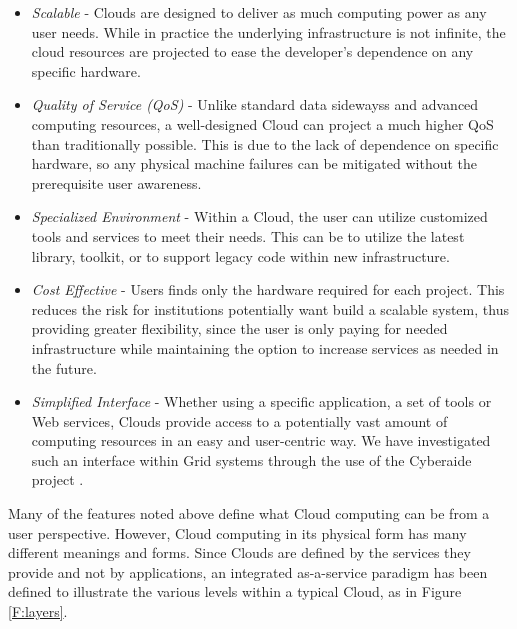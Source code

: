 \begin{itemize}

\item{\em Scalable} - Clouds are designed to deliver as much computing power as any user needs.  While in practice the underlying infrastructure is not infinite, the cloud resources are projected to ease the developer's dependence on any specific hardware.

\item{\em Quality of Service (QoS)} - Unlike standard data sidewayss and advanced computing resources, a well-designed Cloud can project a much higher QoS than traditionally possible.  This is due to the lack of dependence on specific hardware, so any physical machine failures can be mitigated without the prerequisite user awareness.

\item{\em Specialized Environment} - Within a Cloud, the user can utilize customized tools and services to meet their needs. This can be to utilize the latest library, toolkit, or to support legacy code within new infrastructure.  

\item{\em Cost Effective} - Users finds only the hardware required for each project.  This reduces the risk for institutions potentially want build a scalable system, thus providing greater flexibility, since the user is only paying for needed infrastructure while maintaining the option to increase services as needed in the future.

\item{\em Simplified Interface} - Whether using a specific application, a set of tools or Web services, Clouds provide access to a potentially vast amount of computing resources in an easy and user-centric way. We have investigated such an interface within Grid systems through the use of the Cyberaide project \cite{las09ccgrid, las08-javascript}.

\end{itemize}




Many of the features noted above define what Cloud computing can be from a user perspective.  However, Cloud computing in its physical form has many different meanings and forms.  Since Clouds are defined by the services they provide and not by applications, an integrated as-a-service paradigm has been defined to illustrate the various levels within a typical Cloud, as in Figure \ref{F:layers}.

